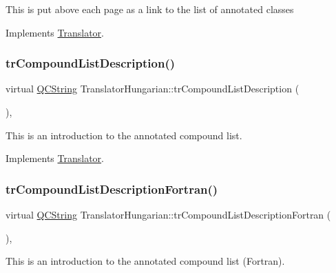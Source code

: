 This is put above each page as a link to the list of annotated classes 

Implements \mbox{\hyperlink{class_translator}{Translator}}.

\mbox{\label{class_translator_hungarian_a5cf79b742f7487c28d6221589e32b19d}} 
\subsubsection{\texorpdfstring{trCompoundListDescription()}{trCompoundListDescription()}}
{\footnotesize\ttfamily virtual \mbox{\hyperlink{class_q_c_string}{Q\+C\+String}} Translator\+Hungarian\+::tr\+Compound\+List\+Description (\begin{DoxyParamCaption}{ }\end{DoxyParamCaption})\hspace{0.3cm}{\ttfamily [inline]}, {\ttfamily [virtual]}}

This is an introduction to the annotated compound list. 

Implements \mbox{\hyperlink{class_translator}{Translator}}.

\mbox{\label{class_translator_hungarian_a4b9c673dc739a0b6190027e32e6cbc58}} 
\subsubsection{\texorpdfstring{trCompoundListDescriptionFortran()}{trCompoundListDescriptionFortran()}}
{\footnotesize\ttfamily virtual \mbox{\hyperlink{class_q_c_string}{Q\+C\+String}} Translator\+Hungarian\+::tr\+Compound\+List\+Description\+Fortran (\begin{DoxyParamCaption}{ }\end{DoxyParamCaption})\hspace{0.3cm}{\ttfamily [inline]}, {\ttfamily [virtual]}}

This is an introduction to the annotated compound list (Fortran). 

